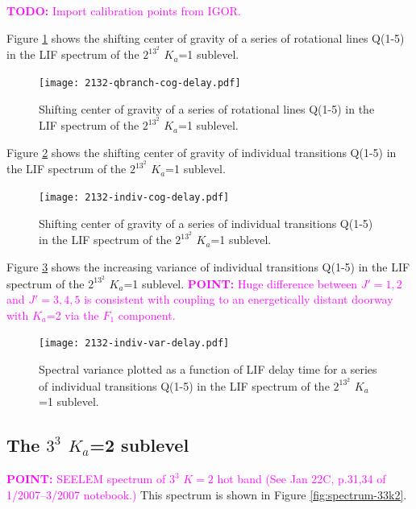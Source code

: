 \documentclass[12pt,draft]{mitthesis}
\newcommand{\TODO} [1]{\textcolor{magenta}{\textbf{TODO:} #1}}
\newcommand{\POINT}[1]{\textcolor{magenta}{\textbf{POINT:} #1}}
\begin{document}
\TODO{Import calibration points from IGOR.}

Figure \ref{fig:2132-qbranch-cog-delay} shows the shifting center of
gravity of a series of rotational lines Q(1-5) in the LIF spectrum of
the $2^13^2$ $K_a$=1 sublevel.

\begin{figure}
  \caption{Shifting center of gravity of a series of rotational lines
    Q(1-5) in the LIF spectrum of the $2^13^2$ $K_a$=1 sublevel.}
  \label{fig:2132-qbranch-cog-delay}
  \centering
  \texttt{[image: 2132-qbranch-cog-delay.pdf]}
\end{figure}

Figure \ref{fig:2132-indiv-cog-delay} shows the shifting center of
gravity of individual transitions Q(1-5) in the LIF spectrum of
the $2^13^2$ $K_a$=1 sublevel.

\begin{figure}
  \caption{Shifting center of gravity of a series of individual
    transitions Q(1-5) in the LIF spectrum of the $2^13^2$ $K_a$=1
    sublevel.}
  \label{fig:2132-indiv-cog-delay}
  \centering
  \texttt{[image: 2132-indiv-cog-delay.pdf]}
\end{figure}

Figure \ref{fig:2132-indiv-var-delay} shows the increasing variance of
individual transitions Q(1-5) in the LIF spectrum of the $2^13^2$
$K_a$=1 sublevel.  \POINT{Huge difference between $J'=1,2$ and
  $J'=3,4,5$ is consistent with coupling to an energetically distant
  doorway with $K_a$=2 via the $F_1$ component.}

\begin{figure}
  \caption{Spectral variance plotted as a function of LIF delay time
    for a series of individual transitions Q(1-5) in the LIF spectrum
    of the $2^13^2$ $K_a$=1 sublevel.}
  \label{fig:2132-indiv-var-delay}
  \centering
  \texttt{[image: 2132-indiv-var-delay.pdf]}
\end{figure}

\subsection{The $3^3$ $K_a$=2 sublevel}

\POINT{SEELEM spectrum of $3^3$ $K=2$ hot band (See Jan 22C, p.31,34
  of 1/2007--3/2007 notebook.)}  This spectrum is shown in Figure
\ref{fig:spectrum-33k2}.
\end{document}
